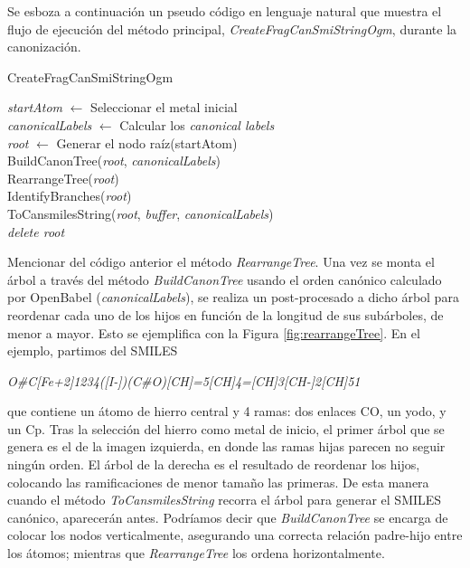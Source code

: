 Se esboza a continuación un pseudo código en lenguaje natural que muestra el flujo de ejecución del método principal, \textit{CreateFragCanSmiStringOgm}, durante la canonización. 
\begin{algorithm}[h!]
   \caption{CreateFragCanSmiStringOgm}
   \textit{startAtom} $\longleftarrow$ Seleccionar el metal inicial \\
   \textit{canonicalLabels} $\longleftarrow$ Calcular los \textit{canonical labels}\\
   \textit{root} $\longleftarrow$ Generar el nodo raíz(startAtom)\\
   BuildCanonTree(\textit{root}, \textit{canonicalLabels})\\
   RearrangeTree(\textit{root})\\
   IdentifyBranches(\textit{root})\\
   ToCansmilesString(\textit{root}, \textit{buffer}, \textit{canonicalLabels})\\
   \textit{delete root} \\
   \label{tab:CreateFragCanSmiStringOgm}
\end{algorithm}

Mencionar del código anterior el método \textit{RearrangeTree}. Una vez se monta el árbol a través del método \textit{BuildCanonTree} usando el orden canónico calculado por OpenBabel (\textit{canonicalLabels}), se realiza un post-procesado a dicho árbol para reordenar cada uno de los hijos en función de la longitud de sus subárboles, de menor a mayor. Esto se ejemplifica con la Figura \ref{fig:rearrangeTree}. En el ejemplo, partimos del SMILES

\begin{center}
\small
\textit{O\#C[Fe+2]1234([I-])(C\#O)[CH]=5[CH]4=[CH]3[CH-]2[CH]51}    
\end{center}

que contiene un átomo de hierro central y 4 ramas: dos enlaces CO, un yodo, y un Cp. Tras la selección del hierro como metal de inicio, el primer árbol que se genera es el de la imagen izquierda, en donde las ramas hijas parecen no seguir ningún orden. El árbol de la derecha es el resultado de reordenar los hijos, colocando las ramificaciones de menor tamaño las primeras. De esta manera cuando el método \textit{ToCansmilesString} recorra el árbol para generar el SMILES canónico,  aparecerán antes. Podríamos decir que \textit{BuildCanonTree} se encarga de colocar los nodos verticalmente, asegurando una correcta relación padre-hijo entre los átomos; mientras que \textit{RearrangeTree} los ordena horizontalmente.

